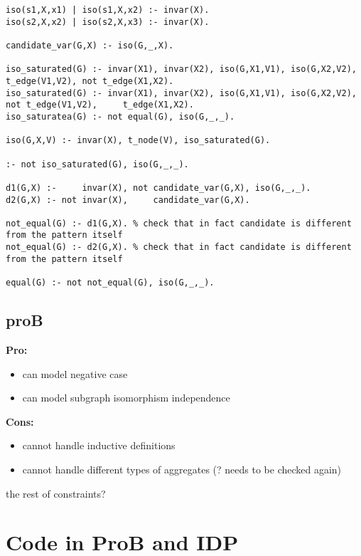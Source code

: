 \documentclass{article}
\theoremstyle{definition}
\begin{document}
\begin{lstlisting}[caption=Canonicity previous solution isomorphism check]
iso(s1,X,x1) | iso(s1,X,x2) :- invar(X).
iso(s2,X,x2) | iso(s2,X,x3) :- invar(X).

candidate_var(G,X) :- iso(G,_,X).

iso_saturated(G) :- invar(X1), invar(X2), iso(G,X1,V1), iso(G,X2,V2),     t_edge(V1,V2), not t_edge(X1,X2). 
iso_saturated(G) :- invar(X1), invar(X2), iso(G,X1,V1), iso(G,X2,V2), not t_edge(V1,V2),     t_edge(X1,X2). 
iso_saturatea(G) :- not equal(G), iso(G,_,_). 

iso(G,X,V) :- invar(X), t_node(V), iso_saturated(G).

:- not iso_saturated(G), iso(G,_,_).

d1(G,X) :-     invar(X), not candidate_var(G,X), iso(G,_,_).
d2(G,X) :- not invar(X),     candidate_var(G,X).

not_equal(G) :- d1(G,X). % check that in fact candidate is different from the pattern itself
not_equal(G) :- d2(G,X). % check that in fact candidate is different from the pattern itself

equal(G) :- not not_equal(G), iso(G,_,_).
\end{lstlisting}


\subsection{proB}
\textbf{Pro:}
\begin{itemize}
  \item can model negative case
  \item can model subgraph isomorphism independence
\end{itemize}
\textbf{Cons:}
\begin{itemize}
  \item cannot handle inductive definitions
  \item cannot handle different types of aggregates (? needs to be checked again)
\end{itemize}

the rest of constraints? 

\section{Code in ProB and IDP}

\pagebreak

\end{document}
